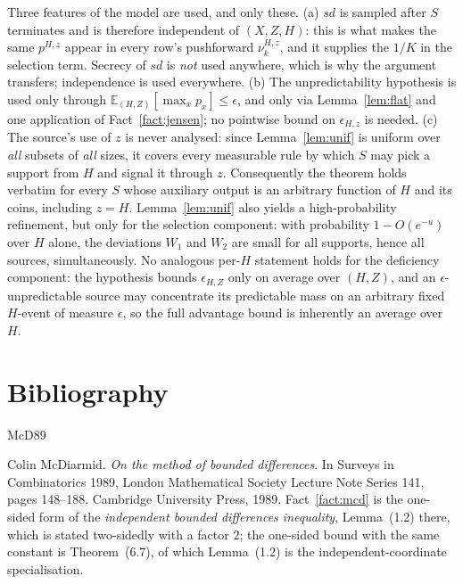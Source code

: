 \documentclass{conjura-solution}
\newcommand{\sd}{\mathit{sd}}
\theoremstyle{cjplain}
\begin{document}
\begin{remark}
Three features of the model are used, and only these. (a) $\sd$ is sampled after $S$ terminates and
is therefore independent of $(X,Z,H)$: this is what makes the same $p^{H,z}$ appear in every row's
pushforward $\nu^{H,z}_{k}$, and it supplies the $1/K$ in the selection term. Secrecy of $\sd$ is
\emph{not} used anywhere, which is why the argument transfers; independence is used everywhere. (b)
The unpredictability hypothesis is used only through $\mathbb{E}_{(H,Z)}[\max_x p_x] \le \epsilon$,
and only via Lemma~\ref{lem:flat} and one application of Fact~\ref{fact:jensen}; no pointwise bound on
$\epsilon_{H,z}$ is needed. (c) The source's use of $z$ is never analysed: since
Lemma~\ref{lem:unif} is uniform over \emph{all} subsets of \emph{all} sizes, it covers every
measurable rule by which $S$ may pick a support from $H$ and signal it through $z$. Consequently the
theorem holds verbatim for every $S$ whose auxiliary output is an arbitrary function of $H$ and its
coins, including $z = H$. Lemma~\ref{lem:unif} also yields a high-probability refinement, but only
for the selection component: with probability $1 - O(e^{-u})$ over $H$ alone, the deviations
$W_{1}$ and $W_{2}$ are small for all supports, hence all sources, simultaneously. No analogous per-$H$ statement holds for
the deficiency component: the hypothesis bounds $\epsilon_{H,Z}$ only on average over $(H,Z)$, and
an $\epsilon$-unpredictable source may concentrate its predictable mass on an arbitrary fixed $H$-event of
measure $\epsilon$, so the full advantage bound is inherently an average over $H$.
\end{remark}

\section{Bibliography}

\begin{conjurabibliography}{McD89}

Colin McDiarmid.
\emph{On the method of bounded differences}.
In Surveys in Combinatorics 1989, London Mathematical Society Lecture Note Series 141,
pages 148--188. Cambridge University Press, 1989.
Fact~\ref{fact:mcd} is the one-sided form of the \emph{independent bounded differences
inequality}, Lemma~(1.2) there, which is stated two-sidedly with a factor $2$; the one-sided
bound with the same constant is Theorem~(6.7), of which Lemma~(1.2) is the
independent-coordinate specialisation.

\end{conjurabibliography}
\end{document}
